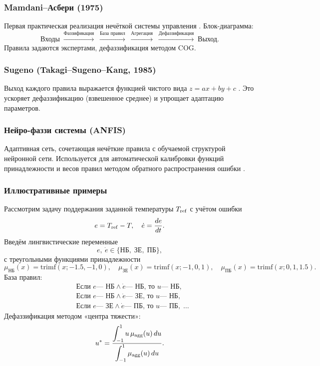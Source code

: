 \subsubsection{Mamdani–Асбери (1975)}
Первая практическая реализация нечёткой системы управления \cite{Mamdani1975}. Блок-диаграмма:
\[
  \text{Входы} \;\xrightarrow{\text{Фаззификация}}\; 
  \xrightarrow{\text{База правил}}\;\xrightarrow{\text{Агрегация}}\;
  \xrightarrow{\text{Дефаззификация}}\;\text{Выход}.
\]
Правила задаются экспертами, дефаззификация методом COG.

\subsubsection{Sugeno (Takagi–Sugeno–Kang, 1985)}
Выход каждого правила выражается функцией чистого вида \(z = a x + b y + c\) \cite{Sugeno1985}. Это ускоряет дефаззификацию (взвешенное среднее) и упрощает адаптацию параметров.

\subsubsection{Нейро-фаззи системы (ANFIS)}
Адаптивная сеть, сочетающая нечёткие правила с обучаемой структурой нейронной сети. Используется для автоматической калибровки функций принадлежности и весов правил методом обратного распространения ошибки \cite{Jang1993}.

\subsubsection{Иллюстративные примеры}

\begin{example}
Рассмотрим задачу поддержания заданной температуры $T_{\rm ref}$ с учётом ошибки 
\[
  e = T_{\rm ref} - T,\quad 
  \dot e = \frac{de}{dt}.
\]
Введём лингвистические переменные
\[
  e,\ \dot e \in \{\text{НБ},\;\text{ЗЕ},\;\text{ПБ}\},
\]
с треугольными функциями принадлежности
\[
  \mu_{\mathrm{НБ}}(x)=\mathrm{trimf}(x; -1.5,-1,0),\quad
  \mu_{\mathrm{ЗЕ}}(x)=\mathrm{trimf}(x; -1,0,1),\quad
  \mu_{\mathrm{ПБ}}(x)=\mathrm{trimf}(x;0,1,1.5).
\]
База правил:
\[
\begin{aligned}
&\text{Если }e\text{— НБ}\land\dot e\text{— НБ, то }u\text{— НБ},\\
&\text{Если }e\text{— НБ}\land\dot e\text{— ЗЕ, то }u\text{— НБ},\\
&\text{Если }e\text{— ЗЕ}\land\dot e\text{— ПБ, то }u\text{— ПБ},\;\dots
\end{aligned}
\]
Дефаззификация методом «центра тяжести»:
\[
  u^* 
  = \frac{\displaystyle\int_{-1}^{1} u\,\mu_{\rm agg}(u)\,du}
         {\displaystyle\int_{-1}^{1}\mu_{\rm agg}(u)\,du}.
\]
\end{example}

